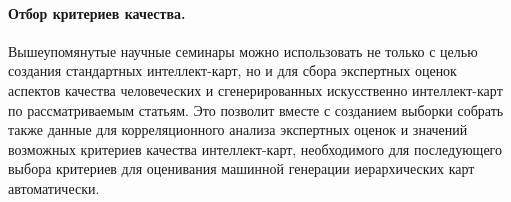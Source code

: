 \documentclass[12pt]{article}
\begin{document}
\paragraph{Отбор критериев качества.} Вышеупомянутые научные семинары можно использовать не только с целью создания стандартных интеллект-карт, но и для сбора экспертных оценок аспектов качества человеческих и сгенерированных искусственно интеллект-карт по рассматриваемым статьям. Это позволит вместе с созданием выборки собрать также данные для корреляционного анализа экспертных оценок и значений возможных критериев качества интеллект-карт, необходимого для последующего выбора критериев для оценивания машинной генерации иерархических карт автоматически.



        

\newpage
{}


\end{document}
